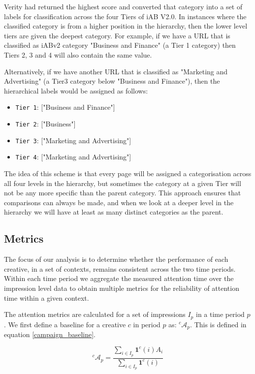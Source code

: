 \documentclass[sigconf]{acmart}
\begin{document}
Verity had returned the
highest score and converted that category into a set of labels for
classification across the four Tiers of iAB V2.0. In instances where the
classified category is from a higher position in the hierarchy, then the
lower level tiers are given the deepest category. For example, if we have
a URL that is classified as iABv2 category "Business and Finance"
(a Tier 1 category) then Tiers 2, 3 and 4 will also contain the same value.

Alternatively, if we have another URL that is classified as "Marketing and Advertising"
(a Tier3 category below "Business and Finance"), then the hierarchical labels
would be assigned as follows:

\begin{itemize}
    \item {\texttt{Tier 1}}: ["Business and Finance"]
    \item {\texttt{Tier 2}}: ["Business"]
    \item {\texttt{Tier 3}}: ["Marketing and Advertising"]
    \item {\texttt{Tier 4}}: ["Marketing and Advertising"]
\end{itemize}


The idea of this scheme is that every page will be assigned a categorisation across
all four levels in the hierarchy, but sometimes the category at a given Tier
will not be any more specific than the parent category. This approach ensures
that comparisons can always be made, and when we look at a deeper level in the hierarchy
we will have at least as many distinct categories as the parent.

\subsection{Metrics}

The focus of our analysis is to determine whether the performance of each creative,
in a set of contexts, remains consistent across the two time periods.
Within each time period we aggregate
the measured attention time over the impression level data to obtain multiple metrics
for the reliability of attention time within a given context.


The attention metrics are calculated for a set of impressions $I_p$ in a time period $p$.
We first define a baseline for a creative $c$ in period $p$ as:
${}^c\mathcal{A}_p$. This is defined in equation \ref{campaign_baseline}.

\begin{equation}
\label{campaign_baseline}
{}^c\mathcal{A}_p =  \frac{ \sum_{i \in I_p} \mathbf{1}^c(i) A_i }{ \sum_{i \in I_p} \mathbf{1}^c(i) }
\end{equation}
\end{document}
